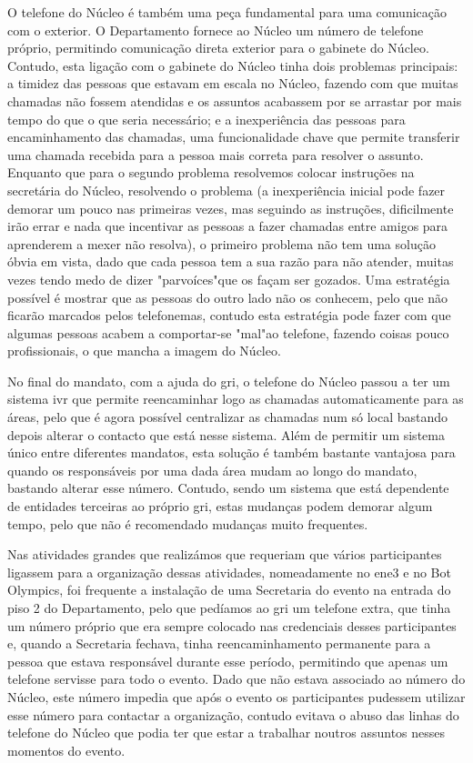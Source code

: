 O telefone do Núcleo é também uma peça fundamental para uma comunicação com o exterior. O Departamento fornece ao Núcleo um número de telefone próprio, permitindo comunicação direta exterior para o gabinete do Núcleo. Contudo, esta ligação com o gabinete do Núcleo tinha dois problemas principais: a timidez das pessoas que estavam em escala no Núcleo, fazendo com que muitas chamadas não fossem atendidas e os assuntos acabassem por se arrastar por mais tempo do que o que seria necessário; e a inexperiência das pessoas para encaminhamento das chamadas, uma funcionalidade chave que permite transferir uma chamada recebida para a pessoa mais correta para resolver o assunto. Enquanto que para o segundo problema resolvemos colocar instruções na secretária do Núcleo, resolvendo o problema (a inexperiência inicial pode fazer demorar um pouco nas primeiras vezes, mas seguindo as instruções, dificilmente irão errar e nada que incentivar as pessoas a fazer chamadas entre amigos para aprenderem a mexer não resolva), o primeiro problema não tem uma solução óbvia em vista, dado que cada pessoa tem a sua razão para não atender, muitas vezes tendo medo de dizer "parvoíces"\space que os façam ser gozados. Uma estratégia possível é mostrar que as pessoas do outro lado não os conhecem, pelo que não ficarão marcados pelos telefonemas, contudo esta estratégia pode fazer com que algumas pessoas acabem a comportar-se "mal"\space ao telefone, fazendo coisas pouco profissionais, o que mancha a imagem do Núcleo.

No final do mandato, com a ajuda do \acrshort{gri}, o telefone do Núcleo passou a ter um sistema \acrfull{ivr} que permite reencaminhar logo as chamadas automaticamente para as áreas, pelo que é agora possível centralizar as chamadas num só local bastando depois alterar o contacto que está nesse sistema. Além de permitir um sistema único entre diferentes mandatos, esta solução é também bastante vantajosa para quando os responsáveis por uma dada área mudam ao longo do mandato, bastando alterar esse número. Contudo, sendo um sistema que está dependente de entidades terceiras ao próprio \acrshort{gri}, estas mudanças podem demorar algum tempo, pelo que não é recomendado mudanças muito frequentes.

Nas atividades grandes que realizámos que requeriam que vários participantes ligassem para a organização dessas atividades, nomeadamente no \acrshort{ene3} e no Bot Olympics, foi frequente a instalação de uma Secretaria do evento na entrada do piso 2 do Departamento, pelo que pedíamos ao \acrshort{gri} um telefone extra, que tinha um número próprio que era sempre colocado nas credenciais desses participantes e, quando a Secretaria fechava, tinha reencaminhamento permanente para a pessoa que estava responsável durante esse período, permitindo que apenas um telefone servisse para todo o evento. Dado que não estava associado ao número do Núcleo, este número impedia que após o evento os participantes pudessem utilizar esse número para contactar a organização, contudo evitava o abuso das linhas do telefone do Núcleo que podia ter que estar a trabalhar noutros assuntos nesses momentos do evento.

